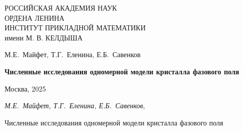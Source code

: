 \documentclass[a4paper, 12pt]{article}
\theoremstyle{plain}
\theoremstyle{remark}
\newcommand{\PreprintTitle}{
  Численные исследования одномерной модели кристалла фазового поля
}
\begin{document}
\begin{titlepage}

\begin{center}
РОССИЙСКАЯ АКАДЕМИЯ НАУК \\
ОРДЕНА ЛЕНИНА \\
ИНСТИТУТ ПРИКЛАДНОЙ МАТЕМАТИКИ \\
имени М. В. КЕЛДЫША

\vspace*{60mm}

\Large{М.Е.~Майфет, Т.Г.~Еленина, Е.Б.~Савенков}

\vspace*{20mm}

\textbf{\large \PreprintTitle}


\vspace*{110mm}

\Large{Москва, 2025}

\vspace*{-50mm}

\end{center}

\end{titlepage}


\setcounter{page}{2}

\thispagestyle{empty}

\noindent\emph{М.Е.~Майфет, Т.Г.~Еленина, Е.Б.~Савенков}, 
\PreprintTitle

\vspace*{3mm}
\end{document}
